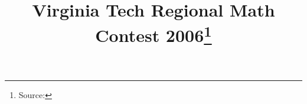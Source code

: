 \documentclass[10pt]{article}
\begin{document}
\title{Virginia Tech Regional Math Contest 2006\footnote{Source: \source}}
\author{\vspace{-2ex}}
\date{\vspace{-6ex}} %
\maketitle







\end{document}
